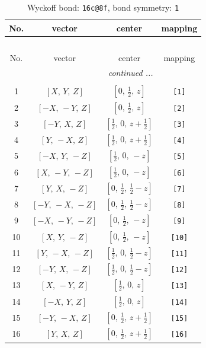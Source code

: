 \documentclass[fleqn,8pt]{jsarticle}
\begin{document}
\begin{longtable}{cccc}
\caption{Wyckoff bond: {\tt 16c@8f}, bond symmetry: {\tt 1}}
 \\
 \hline \hline
No. & vector & center & mapping \\ \hline \endfirsthead

\multicolumn{3}{l}{\tablename\ \thetable{}} \\
 \hline \hline
No. & vector & center & mapping \\ \hline \endhead

 \hline \hline
\multicolumn{3}{r}{\footnotesize\it continued ...} \\ \endfoot

 \hline \hline
\multicolumn{3}{r}{} \\ \endlastfoot

1 & $\left[ X,\, Y,\, Z \right]$ & $\left[ 0,\, \frac{1}{2},\, z \right]$ & {\tt [1]} \\ \hline
2 & $\left[ - X,\, - Y,\, Z \right]$ & $\left[ 0,\, \frac{1}{2},\, z \right]$ & {\tt [2]} \\ \hline
3 & $\left[ - Y,\, X,\, Z \right]$ & $\left[ \frac{1}{2},\, 0,\, z + \frac{1}{2} \right]$ & {\tt [3]} \\ \hline
4 & $\left[ Y,\, - X,\, Z \right]$ & $\left[ \frac{1}{2},\, 0,\, z + \frac{1}{2} \right]$ & {\tt [4]} \\ \hline
5 & $\left[ - X,\, Y,\, - Z \right]$ & $\left[ \frac{1}{2},\, 0,\, - z \right]$ & {\tt [5]} \\ \hline
6 & $\left[ X,\, - Y,\, - Z \right]$ & $\left[ \frac{1}{2},\, 0,\, - z \right]$ & {\tt [6]} \\ \hline
7 & $\left[ Y,\, X,\, - Z \right]$ & $\left[ 0,\, \frac{1}{2},\, \frac{1}{2} - z \right]$ & {\tt [7]} \\ \hline
8 & $\left[ - Y,\, - X,\, - Z \right]$ & $\left[ 0,\, \frac{1}{2},\, \frac{1}{2} - z \right]$ & {\tt [8]} \\ \hline
9 & $\left[ - X,\, - Y,\, - Z \right]$ & $\left[ 0,\, \frac{1}{2},\, - z \right]$ & {\tt [9]} \\ \hline
10 & $\left[ X,\, Y,\, - Z \right]$ & $\left[ 0,\, \frac{1}{2},\, - z \right]$ & {\tt [10]} \\ \hline
11 & $\left[ Y,\, - X,\, - Z \right]$ & $\left[ \frac{1}{2},\, 0,\, \frac{1}{2} - z \right]$ & {\tt [11]} \\ \hline
12 & $\left[ - Y,\, X,\, - Z \right]$ & $\left[ \frac{1}{2},\, 0,\, \frac{1}{2} - z \right]$ & {\tt [12]} \\ \hline
13 & $\left[ X,\, - Y,\, Z \right]$ & $\left[ \frac{1}{2},\, 0,\, z \right]$ & {\tt [13]} \\ \hline
14 & $\left[ - X,\, Y,\, Z \right]$ & $\left[ \frac{1}{2},\, 0,\, z \right]$ & {\tt [14]} \\ \hline
15 & $\left[ - Y,\, - X,\, Z \right]$ & $\left[ 0,\, \frac{1}{2},\, z + \frac{1}{2} \right]$ & {\tt [15]} \\ \hline
16 & $\left[ Y,\, X,\, Z \right]$ & $\left[ 0,\, \frac{1}{2},\, z + \frac{1}{2} \right]$ & {\tt [16]} \\
\end{longtable}
\end{document}
